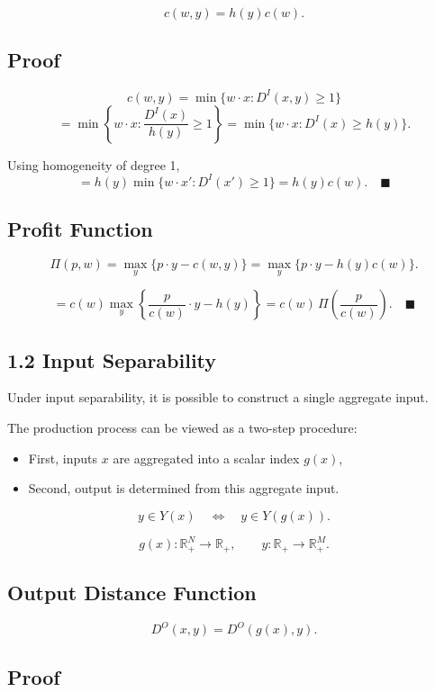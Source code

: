 \[
c(w,y)=h(y)c(w).
\]

\subsection*{Proof}

\[
c(w,y)
=
\min \{w\cdot x : D^I(x,y)\ge 1\}
\]
\[
=
\min \left\{w\cdot x : \frac{D^I(x)}{h(y)} \ge 1 \right\}
=
\min \{w\cdot x : D^I(x)\ge h(y)\}.
\]

Using homogeneity of degree 1,
\[
=
h(y)\min \{w\cdot x' : D^I(x')\ge 1\}
=
h(y)c(w).
\quad \blacksquare
\]

\subsection*{Profit Function}

\[
\Pi(p,w)
=
\max_y \{p\cdot y - c(w,y)\}
=
\max_y \{p\cdot y - h(y)c(w)\}.
\]

\[
=
c(w)\max_y \left\{ \frac{p}{c(w)}\cdot y - h(y) \right\}
=
c(w)\,\Pi\!\left(\frac{p}{c(w)}\right).
\quad \blacksquare
\]



\subsection*{1.2 Input Separability}

Under input separability, it is possible to construct a single aggregate input.

The production process can be viewed as a two-step procedure:
\begin{itemize}
    \item First, inputs $x$ are aggregated into a scalar index $g(x)$,
    \item Second, output is determined from this aggregate input.
\end{itemize}

\[
y \in Y(x) \quad \Longleftrightarrow \quad y \in Y(g(x)).
\]

\[
g(x): \mathbb{R}_+^N \to \mathbb{R}_+,
\qquad
y: \mathbb{R}_+ \to \mathbb{R}_+^M.
\]

\subsection*{Output Distance Function}

\[
D^O(x,y)=D^O(g(x),y).
\]

\subsection*{Proof}

